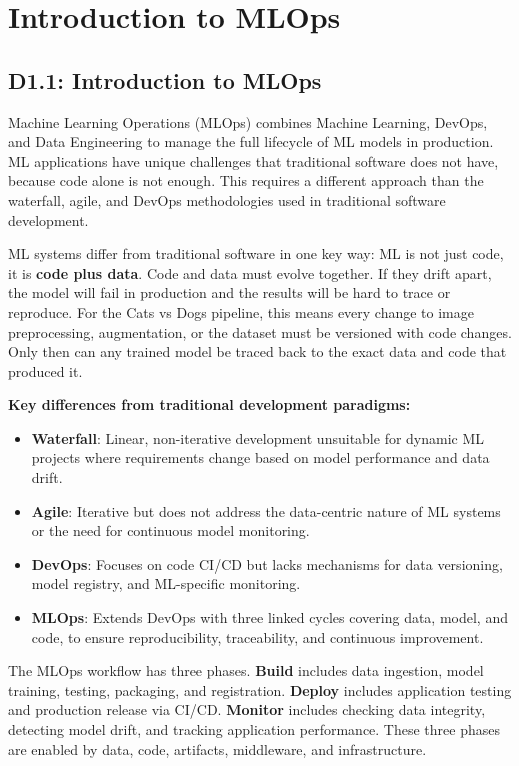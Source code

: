 \documentclass[10pt,twocolumn,letterpaper]{article}
\begin{document}
\section{Introduction to MLOps}\label{sec:intro}

\subsection{D1.1: Introduction to MLOps}
Machine Learning Operations (MLOps) combines Machine Learning, DevOps, and Data Engineering to manage the full lifecycle of ML models in production. ML applications have unique challenges that traditional software does not have, because code alone is not enough. This requires a different approach than the waterfall, agile, and DevOps methodologies used in traditional software development.

ML systems differ from traditional software in one key way: ML is not just code, it is \textbf{code plus data}. Code and data must evolve together. If they drift apart, the model will fail in production and the results will be hard to trace or reproduce. For the Cats vs Dogs pipeline, this means every change to image preprocessing, augmentation, or the dataset must be versioned with code changes. Only then can any trained model be traced back to the exact data and code that produced it.

\textbf{Key differences from traditional development paradigms:}
\begin{itemize}
    \item \textbf{Waterfall}: Linear, non-iterative development unsuitable for dynamic ML projects where requirements change based on model performance and data drift.
    \item \textbf{Agile}: Iterative but does not address the data-centric nature of ML systems or the need for continuous model monitoring.
    \item \textbf{DevOps}: Focuses on code CI/CD but lacks mechanisms for data versioning, model registry, and ML-specific monitoring.
    \item \textbf{MLOps}: Extends DevOps with three linked cycles covering data, model, and code, to ensure reproducibility, traceability, and continuous improvement.
\end{itemize}

The MLOps workflow has three phases. \textbf{Build} includes data ingestion, model training, testing, packaging, and registration. \textbf{Deploy} includes application testing and production release via CI/CD. \textbf{Monitor} includes checking data integrity, detecting model drift, and tracking application performance. These three phases are enabled by data, code, artifacts, middleware, and infrastructure.
\end{document}
